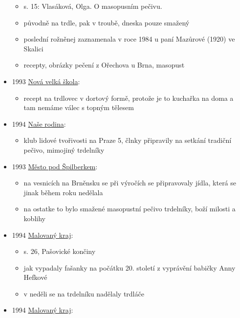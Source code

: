 \begin{itemize}
  \begin{itemize}
  \tightlist
  \item
    s. 15: Vlasáková, Olga. O masopusním pečivu.
  \item
    původně na trdle, pak v troubě, dneska pouze smažený
  \item
    poslední rožněnej zaznamenala v roce 1984 u paní Mazůrové (1920) ve
    Skalici
  \item
    recepty, obrázky pečení z Ořechova u Brna, masopust
  \end{itemize}
\item
  1993
  \href{https://ceskadigitalniknihovna.cz/view/uuid:e294a2f0-8260-11e3-a6e0-005056827e52?page=uuid:32da4ff0-96d7-11e3-ad99-001018b5eb5c&fulltext=trdlovec&source=mzk}{Nová
  velká škola}:

  \begin{itemize}
  \tightlist
  \item
    recept na trdlovec v dortový formě, protože je to kuchařka na doma a
    tam nemáme válec s topným tělesem
  \end{itemize}
\item
  1994
  \href{https://ceskadigitalniknihovna.cz/uuid/uuid:7e0705a0-528b-11e6-beb0-001018b5eb5c}{Naše
  rodina}:

  \begin{itemize}
  \tightlist
  \item
    klub lidové tvořivosti na Praze 5, člnky připravily na setkání
    tradiční pečivo, mimojiný trdelníky
  \end{itemize}
\item
  1993
  \href{https://ceskadigitalniknihovna.cz/uuid/uuid:f9f63a60-98ab-11e3-8e84-005056827e51}{Město
  pod Špilberkem}:

  \begin{itemize}
  \tightlist
  \item
    na vesnicích na Brněnsku se při výročích se připravovaly jídla,
    která se jinak během roku nedělala
  \item
    na ostatke to bylo smažené masopustní pečivo trdelníky, boží milosti
    a koblihy
  \end{itemize}
\item
  1994
  \href{https://ceskadigitalniknihovna.cz/uuid/uuid:1e8fe7c0-21a7-11e4-a8ab-001018b5eb5c}{Malovaný
  kraj}:

  \begin{itemize}
  \tightlist
  \item
    s. 26, Pašovické končiny
  \item
    jak vypadaly fašanky na počátku 20. století z vyprávění babičky Anny
    Hefkové
  \item
    v neděli se na trdelníku nadělaly trdláče
  \end{itemize}
\item
  1994
  \href{https://ceskadigitalniknihovna.cz/uuid/uuid:464cbdb0-4060-11e4-8f33-5ef3fc9ae867}{Malovaný
  kraj}:


\end{itemize}
